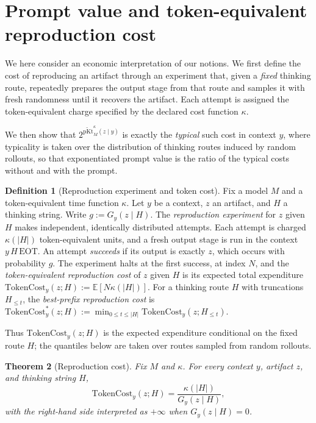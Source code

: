 \documentclass[letterpaper]{article} %
\newtheorem{theorem}{Theorem}[section]
\theoremstyle{definition}
\newtheorem{definition}[theorem]{Definition}
\theoremstyle{remark}
\newcommand{\EOT}{\mathrm{EOT}}
\newcommand{\E}{\mathbb{E}}
\newcommand{\TC}{\mathrm{TokenCost}}
\newcommand{\pKt}{\mathrm{pKt}}
\newcommand{\pKtt}{\widetilde{\pKt}}
\begin{document}
\section{Prompt value and token-equivalent reproduction cost}\label{sec:tokencost}

We here consider an economic interpretation of our notions. We first define
the cost of reproducing an artifact through an experiment that, given a
\emph{fixed} thinking route, repeatedly prepares the output stage from that
route and samples it with fresh randomness until it recovers the artifact.
Each attempt is assigned the token-equivalent charge specified by the declared
cost function \(\kappa\).

We then show that $2^{\pKtt^{\kappa}_M(z \mid y)}$ is exactly the
\emph{typical} such cost in context \(y\), where typicality is taken over the distribution of thinking
routes induced by random rollouts, so that exponentiated prompt value is the
ratio of the typical costs without and with the prompt.

\begin{definition}[Reproduction experiment and token cost]\label{def:tc}
Fix a model \(M\) and a token-equivalent time function \(\kappa\). Let \(y\)
be a context, \(z\) an artifact, and \(H\) a thinking string. Write
\(g:=G_y(z\mid H)\). The
\emph{reproduction experiment} for $z$ given $H$
makes independent, identically distributed attempts. Each attempt is charged
$\kappa(|H|)$ token-equivalent units, and a fresh output stage is run in the
context $y\,H\,\EOT$. An attempt
\emph{succeeds} if its output is exactly $z$, which occurs with probability
$g$. The experiment halts at the first success, at index $N$, and the
\emph{token-equivalent reproduction cost} of $z$ given $H$ is its expected
total expenditure
$\TC_y(z; H) := \E[N\kappa(|H|)]$.
For a thinking route $H$ with
truncations $H_{\le t}$, the
\emph{best-prefix reproduction cost} is
$\TC^*_y(z; H) := \min_{0\le t\le |H|} \TC_y(z; H_{\le t})$.
\end{definition}

Thus \(\TC_y(z;H)\) is the expected expenditure conditional on the fixed
route \(H\); the quantiles below are taken over routes sampled from random rollouts.

\begin{theorem}[Reproduction cost]\label{thm:bill}
Fix $M$ and $\kappa$. For every context $y$, artifact $z$, and thinking string
$H$,
$$\displaystyle \TC_y(z; H) = \frac{\kappa(|H|)}{G_y(z \mid H)},$$ with the
right-hand side interpreted as $+\infty$ when $G_y(z\mid H)=0$.
\end{theorem}
\end{document}
